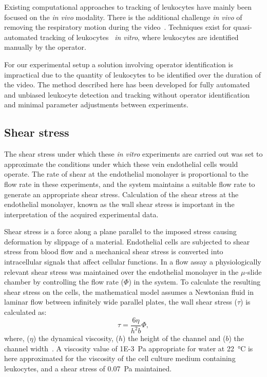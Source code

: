 Existing computational approaches to tracking of leukocytes have mainly been focused on the \emph{in vivo} modality. There is the additional challenge \emph{in vivo} of removing the respiratory motion during the video~\cite{Ray2002,Sperandio2006}. Techniques exist for quasi-automated tracking of leukocytes~\cite{Acton2002, Debeir2005} \emph{in vitro}, where leukocytes are identified manually by the operator.

For our experimental setup a solution involving operator identification is impractical due to the quantity of leukocytes to be identified over the duration of the video. The method described here has been developed for fully automated and unbiased leukocyte detection and tracking without operator identification and minimal parameter adjustments between experiments.

\subsection{Shear stress}
\label{leukocytes:introduction:shear}
The shear stress under which these \emph{in vitro} experiments are carried out was set to approximate the conditions under which these vein endothelial cells would operate. The rate of shear at the endothelial monolayer is proportional to the flow rate in these experiments, and the system maintains a suitable flow rate to generate an appropriate shear stress. Calculation of the shear stress at the endothelial monolayer, known as the wall shear stress is important in the interpretation of the acquired experimental data.

Shear stress is a force along a plane parallel to the imposed stress causing deformation by slippage of a material. Endothelial cells are subjected to shear stress from blood flow and a mechanical shear stress is converted into intracellular signals that affect cellular functions. In a flow assay a physiologically relevant shear stress was maintained over the endothelial monolayer in the $\mu$-slide chamber by controlling the flow rate ($\Phi$) in the system. To calculate the resulting shear stress on the cells, the mathematical model assumes a Newtonian fluid in laminar flow between infinitely wide parallel plates, the wall shear stress ($\tau$) is calculated as:
\begin{equation}
	\tau=\frac{6\eta}{h^2b}\Phi,
\end{equation}
where, ($\eta$) the dynamical viscosity, ($h$) the height of the channel and ($b$) the channel width~\cite{Bacabac2005}. A viscosity value of \SI{1E-3}{Pa} appropriate for water at \SI{22}{\degreeCelsius} is here approximated for the viscosity of the cell culture medium containing leukocytes, and a shear stress of \SI{0.07}{\pascal} maintained.

